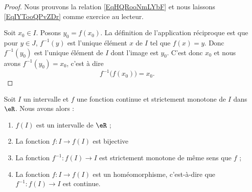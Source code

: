 \begin{proof}
    Nous prouvons la relation \eqref{EqHQRooNmLYbF} et nous laissons \eqref{EqIYTooQPvZDr} comme exercice au lecteur.

    Soit \( x_0\in I\). Posons \( y_0=f(x_0)\). La définition de l'application réciproque est que pour \( y\in J\), \( f^{-1}(y)\) est l'unique élément \( x\) de \( I\) tel que \( f(x)=y\). Donc \( f^{-1}(y_0)\) est l'unique élément de \( I\) dont l'image est \( y_0\). C'est donc \( x_0\) et nous avons \( f^{-1}(y_0)=x_0\), c'est à dire
    \begin{equation}
        f^{-1}\big( f(x_0) \big)=x_0.
    \end{equation}
\end{proof}

\begin{theorem} \label{ThoKBRooQKXThd}
    Soit $I$ un intervalle et $f$ une fonction continue et strictement monotone de $I$ dans \( \eR\). Nous avons alors :
    \begin{enumerate}
        \item
            $f(I)$ est un intervalle de \( \eR\) ;
        \item       \label{ITEMooMAWXooZXmVwA}
            La fonction \( f\colon I\to f(I)\) est bijective
        \item
            La fonction \( f^{-1}\colon f(I)\to I\) est strictement monotone de même sens que $f$ ;
        \item \label{ItemEJZooKuFoeFiv}
            La fonction \( f\colon I\to f(I)\) est un homéomorphisme, c'est-à-dire que \( f^{-1}\colon f(I)\to I\) est continue.
    \end{enumerate}
\end{theorem}

